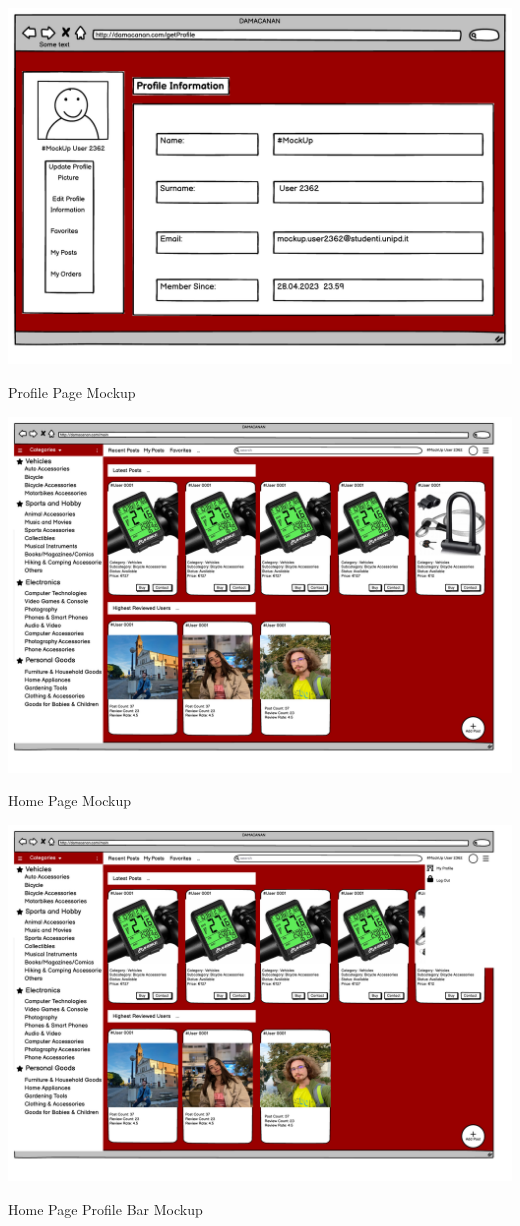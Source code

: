 \begin{center}
\includegraphics[scale = 0.7, center]{Mockup/Profile_Page_Mockup.pdf}
\caption{Profile Page Mockup}
\label{fig:my_label}




\includegraphics[scale = 0.7, center]{Mockup/Main_Page_Mockup.pdf}
\caption{Home Page Mockup}
\label{fig:my_label}




\includegraphics[scale = 0.7, center]{Mockup/Main_Page_ProfieBar_Mockup.pdf}
\caption{Home Page Profile Bar Mockup}
\label{fig:my_label}





\end{center}
